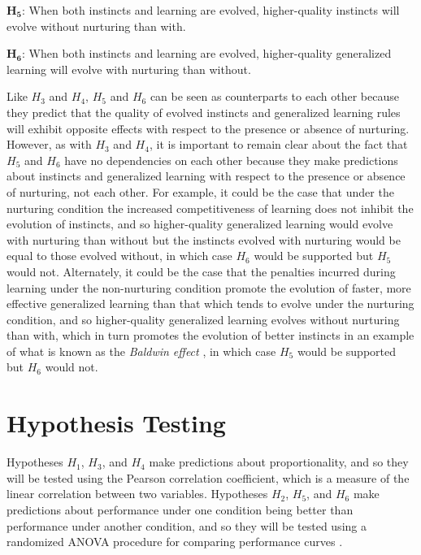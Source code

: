 \documentclass[master]{outhesis}
\begin{document}
$\mathbf{H_5}$: When both instincts and learning are evolved, higher-quality instincts will evolve without nurturing than with.

$\mathbf{H_6}$: When both instincts and learning are evolved, higher-quality generalized learning will evolve with nurturing than without.

Like $H_3$ and $H_4$, $H_5$ and $H_6$ can be seen as counterparts to each other
because they predict that the quality of evolved instincts and generalized learning rules will exhibit opposite effects with respect to the presence or absence of nurturing.
However, as with $H_3$ and $H_4$, it is important to remain clear about the fact that $H_5$ and $H_6$ have no dependencies on each other because they make predictions about instincts and generalized learning with respect to the presence or absence of nurturing, not each other.
For example, it could be the case that under the nurturing condition the increased competitiveness of learning does not inhibit the evolution of instincts,
and so higher-quality generalized learning would evolve with nurturing than without but the instincts evolved with nurturing would be equal to those evolved without,
in which case $H_6$ would be supported but $H_5$ would not.
Alternately, it could be the case that the penalties incurred during learning under the non-nurturing condition promote the evolution of faster, more effective generalized learning than that which tends to evolve under the nurturing condition,
and so higher-quality generalized learning evolves without nurturing than with,
which in turn promotes the evolution of better instincts in an example of what is known as the \emph{Baldwin effect} \citep{Floreano:2008wv},
in which case $H_5$ would be supported but $H_6$ would not.

\section{Hypothesis Testing}

Hypotheses $H_1$, $H_3$, and $H_4$ make predictions about proportionality, 
and so they will be tested using the Pearson correlation coefficient,
which is a measure of the linear correlation between two variables.
Hypotheses $H_2$, $H_5$, and $H_6$ make predictions about performance under one condition being better than performance under another condition,
and so they will be tested using a randomized ANOVA procedure for comparing performance curves \citep{Piater:1998aa}.

\end{document}
